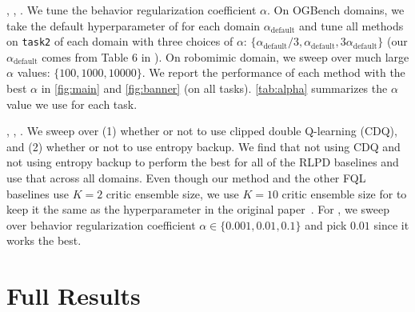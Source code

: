 , , . We tune the behavior regularization coefficient $\alpha$. On OGBench domains, we take the default hyperparameter of  for each domain $\alpha_{\mathrm{default}}$ and tune all methods on \texttt{task2} of each domain with three choices of $\alpha$: $\{\alpha_{\mathrm{default}} / 3, \alpha_{\mathrm{default}}, 3\alpha_{\mathrm{default}} \}$ (our $\alpha_{\mathrm{default}}$ comes from Table 6 in \citet{park2025flow}). On robomimic domain, we sweep over much large $\alpha$ values: $\{100, 1000, 10000\}$. We report the performance of each method with the best $\alpha$ in \cref{fig:main} and \cref{fig:banner} (on all tasks). \cref{tab:alpha} summarizes the $\alpha$ value we use for each task.

, , . We sweep over (1) whether or not to use clipped double Q-learning (CDQ), and (2) whether or not to use entropy backup. We find that not using CDQ and not using entropy backup to perform the best for all of the RLPD baselines and use that across all domains. Even though our method and the other FQL baselines use $K=2$ critic ensemble size, we use $K=10$ critic ensemble size for  to keep it the same as the hyperparameter in the original paper~\citep{ball2023efficient}.
For , we sweep over behavior regularization coefficient $\alpha \in \{0.001, 0.01, 0.1\}$ and pick $0.01$ since it works the best.




\section{Full Results}
\label{appendix:results}



